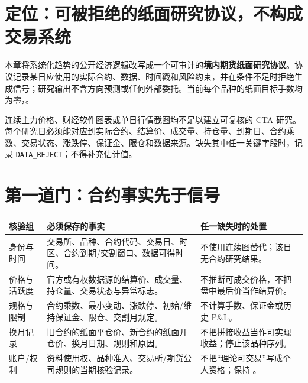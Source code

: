 \section{定位：可被拒绝的纸面研究协议，不构成交易系统}

本章将系统化趋势的公开经济逻辑改写成一个可审计的\textbf{境内期货纸面研究协议}。协议记录某日应使用的实际合约、数据、时间戳和风险约束，并在条件不足时拒绝生成信号；研究输出不含方向预测或任何外部委托。当前每个品种的纸面目标手数均为零，\qzero{}。

\begin{sourcequalitybox}
连续主力价格、财经软件图表或单日行情截图均不足以建立可复核的 CTA 研究。每个研究日必须能对应到实际合约、结算价、成交量、持仓量、到期日、合约乘数、交易状态、涨跌停、保证金、限仓和数据来源。缺失其中任一关键字段时，记录 \texttt{DATA\_REJECT}；不得补充估计值。
\end{sourcequalitybox}

\section{第一道门：合约事实先于信号}

\begin{exhibitbox}
\small
\begin{tabularx}{\exhibitboxwidth}{L{2.45cm}X L{3.85cm}}
\toprule
\textbf{核验组} & \textbf{必须保存的事实} & \textbf{任一缺失时的处置} \\
\midrule
身份与时间 & 交易所、品种、合约代码、交易日、时区、合约到期/交割窗口、数据可得时间。 & 不使用连续图替代；该日无合约研究结果。 \\
价格与活跃度 & 官方或有权数据源的结算价、成交量、持仓量、交易状态与异常标志。 & 不推断可成交价格，不把盘中最后价当作结算价。 \\
规格与限制 & 合约乘数、最小变动、涨跌停、初始/维持保证金、限仓、交割月规定。 & 不计算手数、保证金或历史 P\&L。 \\
换月记录 & 旧合约的纸面平仓价、新合约的纸面开仓价、换月日期、规则和原因。 & 不把拼接收益当作可实现收益；停止该品种序列。 \\
账户/权利 & 资料使用权、品种准入、交易所/期货公司规则的当期核验记录。 & 不把“理论可交易”写成个人资格；保持 \qzero{}。 \\
\bottomrule
\end{tabularx}
\end{exhibitbox}

